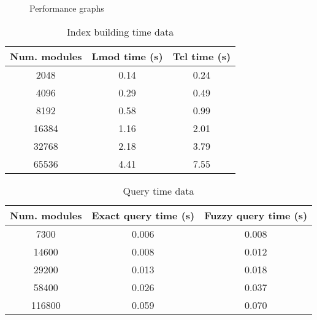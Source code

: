 \documentclass[manuscript,screen]{acmart}
\begin{document}
\begin{figure}
\begin{subfigure}{.5\textwidth}
    \end{subfigure}
    \caption{Performance graphs}
    \label{fig:graphs}
\end{figure}

\begin{table}
  \begin{tabular}{ccc}
    \toprule
      Num. modules & Lmod time (s) & Tcl time (s) \\
    \midrule
      2048 & 0.14 & 0.24 \\
      4096 & 0.29 & 0.49 \\
      8192 & 0.58 & 0.99 \\
      16384 & 1.16 & 2.01 \\
      32768 & 2.18 & 3.79 \\
      65536 & 4.41 & 7.55 \\
  \bottomrule
\end{tabular}
  \caption{Index building time data}
  \label{tab:build}
\end{table}

\begin{table}
  \begin{tabular}{ccc}
    \toprule
      Num. modules & Exact query time (s) & Fuzzy query time (s) \\
    \midrule
      7300 & 0.006 & 0.008 \\
      14600 & 0.008 & 0.012 \\
      29200 & 0.013 & 0.018 \\
      58400 & 0.026 & 0.037 \\
      116800 & 0.059 & 0.070 \\
  \bottomrule
\end{tabular}
  \caption{Query time data}
  \label{tab:search}
\end{table}
\end{document}
